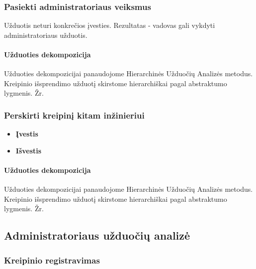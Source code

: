 	\subsubsection{Pasiekti administratoriaus veiksmus}

	Užduotis neturi konkrečios įvesties. 
	Rezultatas - vadovas gali vykdyti administratoriaus užduotis.
		
	\paragraph{Užduoties dekompozicija}
	
	Užduoties dekompozicijai panaudojome Hierarchinės Užduočių Analizės metodus.
	Kreipinio išsprendimo užduotį skirstome hierarchiškai pagal abstraktumo lygmenis. 
	Žr. 	
 		

	\subsubsection{Perskirti kreipinį kitam inžinieriui}

		\begin{itemize}
			\item \textbf{Įvestis}
			\item \textbf{Išvestis} 
		\end{itemize}
		
	\paragraph{Užduoties dekompozicija}
	
	Užduoties dekompozicijai panaudojome Hierarchinės Užduočių Analizės metodus.
	Kreipinio išsprendimo užduotį skirstome hierarchiškai pagal abstraktumo lygmenis. 
	Žr. 
 	

\subsection{Administratoriaus užduočių analizė}

	\subsubsection{Kreipinio registravimas}

